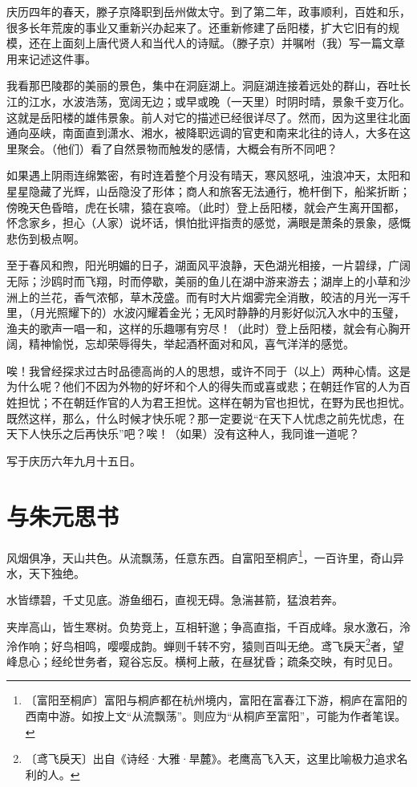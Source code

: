 \documentclass[12pt,UTF-8,openany,a4]{ctexbook}
\begin{document}
\begin{large}
    \yiwen 
    庆历四年的春天，滕子京降职到岳州做太守。到了第二年，政事顺利，百姓和乐，很多长年荒废的事业又重新兴办起来了。还重新修建了岳阳楼，扩大它旧有的规模，还在上面刻上唐代贤人和当代人的诗赋。（滕子京）并嘱咐（我）写一篇文章用来记述这件事。
    
    我看那巴陵郡的美丽的景色，集中在洞庭湖上。洞庭湖连接着远处的群山，吞吐长江的江水，水波浩荡，宽阔无边；或早或晚（一天里）时阴时晴，景象千变万化。这就是岳阳楼的雄伟景象。前人对它的描述已经很详尽了。然而，因为这里往北面通向巫峡，南面直到潇水、湘水，被降职远调的官吏和南来北往的诗人，大多在这里聚会。（他们）看了自然景物而触发的感情，大概会有所不同吧？
    
    如果遇上阴雨连绵繁密，有时连着整个月没有晴天，寒风怒吼，浊浪冲天，太阳和星星隐藏了光辉，山岳隐没了形体；商人和旅客无法通行，桅杆倒下，船桨折断；傍晚天色昏暗，虎在长啸，猿在哀啼。（此时）登上岳阳楼，就会产生离开国都，怀念家乡，担心（人家）说坏话，惧怕批评指责的感觉，满眼是萧条的景象，感慨悲伤到极点啊。
    
    至于春风和煦，阳光明媚的日子，湖面风平浪静，天色湖光相接，一片碧绿，广阔无际；沙鸥时而飞翔，时而停歇，美丽的鱼儿在湖中游来游去；湖岸上的小草和沙洲上的兰花，香气浓郁，草木茂盛。而有时大片烟雾完全消散，皎洁的月光一泻千里，（月光照耀下的）水波闪耀着金光；无风时静静的月影好似沉入水中的玉璧，渔夫的歌声一唱一和，这样的乐趣哪有穷尽！（此时）登上岳阳楼，就会有心胸开阔，精神愉悦，忘却荣辱得失，举起酒杯面对和风，喜气洋洋的感觉。
    
    唉！我曾经探求过古时品德高尚的人的思想，或许不同于（以上）两种心情。这是为什么呢？他们不因为外物的好坏和个人的得失而或喜或悲；在朝廷作官的人为百姓担忧；不在朝廷作官的人为君王担忧。这样在朝为官也担忧，在野为民也担忧。既然这样，那么，什么时候才快乐呢？那一定要说“在天下人忧虑之前先忧虑，在天下人快乐之后再快乐”吧？唉！（如果）没有这种人，我同谁一道呢？
    
    写于庆历六年九月十五日。
    
\end{large}



\chapter{与朱元思书}

\begin{large}
    
    风烟俱净，天山共色。从流飘荡，任意东西。自富阳至桐庐\footnote{〔富阳至桐庐〕\yiwen 富阳与桐庐都在杭州境内，富阳在富春江下游，桐庐在富阳的西南中游。如按上文“从流飘荡”。则应为“从桐庐至富阳”，可能为作者笔误。}，一百许里，奇山异水，天下独绝。
    
    水皆缥碧，千丈见底。游鱼细石，直视无碍。急湍甚箭，猛浪若奔。
    
    夹岸高山，皆生寒树。负势竞上，互相轩邈；争高直指，千百成峰。泉水激石，泠泠作响；好鸟相鸣，嘤嘤成韵。蝉则千转不穷，猿则百叫无绝。鸢飞戾天\footnote{〔鸢飞戾天〕\yiwen 出自《诗经·大雅·旱麓》。老鹰高飞入天，这里比喻极力追求名利的人。}者，望峰息心；经纶世务者，窥谷忘反。横柯上蔽，在昼犹昏；疏条交映，有时见日。
\end{large}
\end{document}

